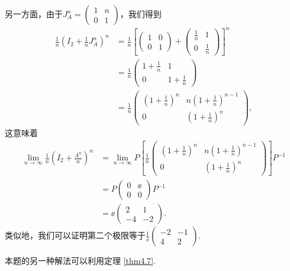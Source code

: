 \begin{solution}
  另一方面，由于$J_A^n=\begin{pmatrix}
    1 & n \\
    0 & 1
  \end{pmatrix}$，我们得到
  \begin{align*}
    \frac1n \left( I_2 + \frac1nJ_A^n \right)^n & = \frac1n \left[ \begin{pmatrix}
      1 & 0 \\
      0 & 1
    \end{pmatrix} + \begin{pmatrix}
      \frac1n & 1 \\
      0 & \frac1n
    \end{pmatrix} \right]^n \\
    & = \frac1n \begin{pmatrix}
      1 + \frac1n & 1 \\
      0 & 1 + \frac1n
    \end{pmatrix} \\
    & = \frac1n\begin{pmatrix}
      \left(1+\frac1n\right)^n & n \left(1+\frac1n\right)^{n-1} \\
      0 & \left(1+\frac1n\right)^n
    \end{pmatrix},
  \end{align*}
  这意味着
  \begin{align*}
    \lim_{n\to\infty} \frac1n \left( I_2 + \frac{A^n}n \right)^n & = \lim_{n\to\infty} P\left[  \frac1n\begin{pmatrix}
      \left(1+\frac1n\right)^n & n \left(1+\frac1n\right)^{n-1} \\
      0 & \left(1+\frac1n\right)^n
    \end{pmatrix} \right] P^{-1} \\
    & = P \begin{pmatrix}
      0 & \ee \\
      0 & 0
    \end{pmatrix} P^{-1} \\
    & = \ee\begin{pmatrix}
      2 & 1 \\
      -4 & -2
    \end{pmatrix}.
  \end{align*}
  类似地，我们可以证明第二个极限等于$\frac1{\ee}\begin{pmatrix}
    -2 & -1 \\
    4 & 2
  \end{pmatrix}$.

  本题的另一种解法可以利用定理 \ref{thm4.7}.
\end{solution}

